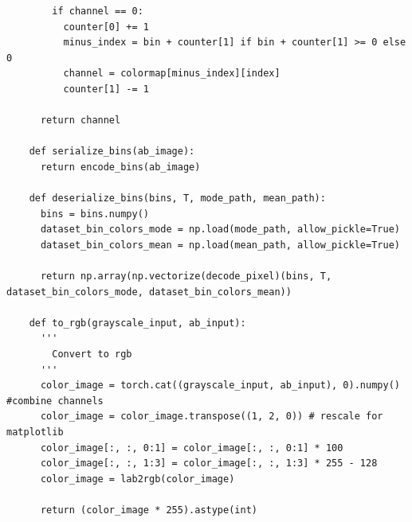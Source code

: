 \begin{longlisting}
\begin{verbatim}
        if channel == 0:
          counter[0] += 1
          minus_index = bin + counter[1] if bin + counter[1] >= 0 else 0
          channel = colormap[minus_index][index]
          counter[1] -= 1

      return channel

    def serialize_bins(ab_image):
      return encode_bins(ab_image)

    def deserialize_bins(bins, T, mode_path, mean_path):
      bins = bins.numpy()
      dataset_bin_colors_mode = np.load(mode_path, allow_pickle=True)
      dataset_bin_colors_mean = np.load(mean_path, allow_pickle=True)

      return np.array(np.vectorize(decode_pixel)(bins, T, dataset_bin_colors_mode, dataset_bin_colors_mean))

    def to_rgb(grayscale_input, ab_input):
      '''
        Convert to rgb
      '''
      color_image = torch.cat((grayscale_input, ab_input), 0).numpy() #combine channels
      color_image = color_image.transpose((1, 2, 0)) # rescale for matplotlib
      color_image[:, :, 0:1] = color_image[:, :, 0:1] * 100
      color_image[:, :, 1:3] = color_image[:, :, 1:3] * 255 - 128
      color_image = lab2rgb(color_image)
      
      return (color_image * 255).astype(int)
  \end{verbatim}
\end{longlisting}

